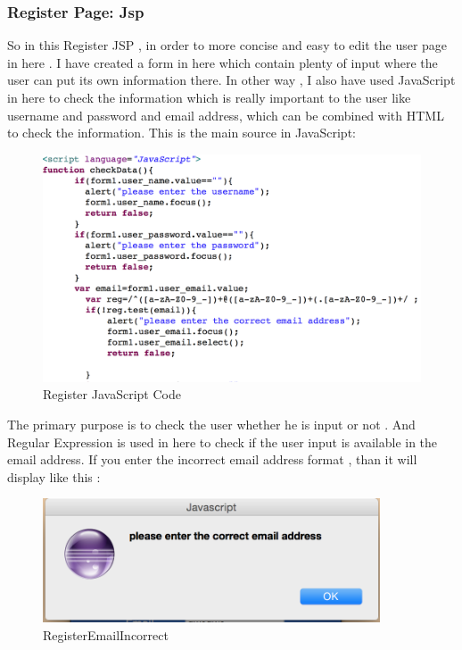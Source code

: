 \documentclass[12pt]{article}
\begin{document}
\subsubsection{Register Page: Jsp}
So in this Register JSP , in order to more concise and easy to edit the user page in here . I have created  a  form in here which contain plenty of  input where the user can put its own information there. In other way , I also have used JavaScript in here to check the information  which is really important to the user like username and password and email  address, which can be combined with HTML to check the information. This is the main source in JavaScript:
\begin{figure}[H]
	\centering
		\includegraphics[width=15cm]{images/RegistJavaScript.jpg}


		\caption[Register JavaScript Code]{Register JavaScript Code}
	\label{fig:Register JavaScript Code}
\end{figure}
The primary purpose is to check the user whether he is input or not .  And  Regular Expression is used in here to check if the user input is available in the email address. If you enter the incorrect email address format , than it will display like this : 
\begin{figure}[H]
	\centering
		
		\includegraphics[width=10cm]{images/RegisterEmailIncorrect.jpg}


		\caption[RegisterEmailIncorrect]{RegisterEmailIncorrect}
	\label{fig:RegisterEmailIncorrect}
\end{figure}
\end{document}
